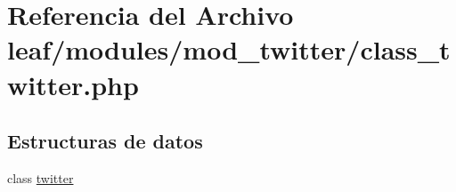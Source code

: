 \hypertarget{class__twitter_8php}{\section{Referencia del Archivo leaf/modules/mod\-\_\-twitter/class\-\_\-twitter.php}
\label{class__twitter_8php}
}
\subsection*{Estructuras de datos}
\begin{DoxyCompactItemize}
\item 
class \hyperlink{classtwitter}{twitter}
\end{DoxyCompactItemize}
